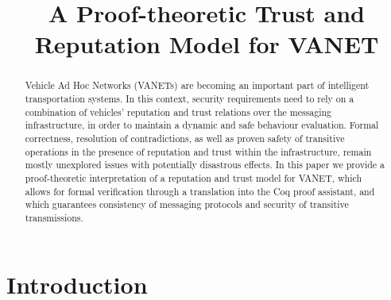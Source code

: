 \documentclass[compsoc, conference, letterpaper, 10pt, times]{IEEEtran}
\begin{document}
\title{A Proof-theoretic Trust and Reputation Model for VANET}


\author{
	}


\maketitle

\begin{abstract}
Vehicle Ad Hoc Networks (VANETs) are becoming an important part of intelligent transportation systems. In this context, security requirements need to rely on a combination of vehicles' reputation and trust relations over the messaging infrastructure, in order to maintain a dynamic and safe behaviour evaluation. Formal correctness, resolution of contradictions, as well as proven safety of transitive operations in the presence of reputation and trust within the infrastructure, remain mostly unexplored issues with potentially disastrous effects. In this paper we provide a proof-theoretic interpretation of a reputation and trust model for VANET, which allows for formal verification through a translation into the Coq proof assistant, and which guarantees consistency of messaging protocols and security of transitive transmissions.
\end{abstract}


\section{Introduction}\label{sec:intro}
\end{document}
